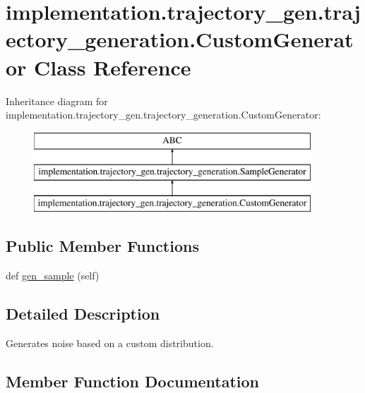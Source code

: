 \hypertarget{classimplementation_1_1trajectory__gen_1_1trajectory__generation_1_1_custom_generator}{}\section{implementation.\+trajectory\+\_\+gen.\+trajectory\+\_\+generation.\+Custom\+Generator Class Reference}
\label{classimplementation_1_1trajectory__gen_1_1trajectory__generation_1_1_custom_generator}
Inheritance diagram for implementation.\+trajectory\+\_\+gen.\+trajectory\+\_\+generation.\+Custom\+Generator\+:\begin{figure}[H]
\begin{center}
\leavevmode
\includegraphics[height=3.000000cm]{classimplementation_1_1trajectory__gen_1_1trajectory__generation_1_1_custom_generator}
\end{center}
\end{figure}
\subsection*{Public Member Functions}
\begin{DoxyCompactItemize}
\item 
def \hyperlink{classimplementation_1_1trajectory__gen_1_1trajectory__generation_1_1_custom_generator_aec90c0146f968d5140a0245d4363daaf}{gen\+\_\+sample} (self)
\end{DoxyCompactItemize}


\subsection{Detailed Description}
\begin{DoxyVerb}Generates noise based on a custom distribution.
\end{DoxyVerb}
 

\subsection{Member Function Documentation}
\mbox{\label{classimplementation_1_1trajectory__gen_1_1trajectory__generation_1_1_custom_generator_aec90c0146f968d5140a0245d4363daaf}} 
